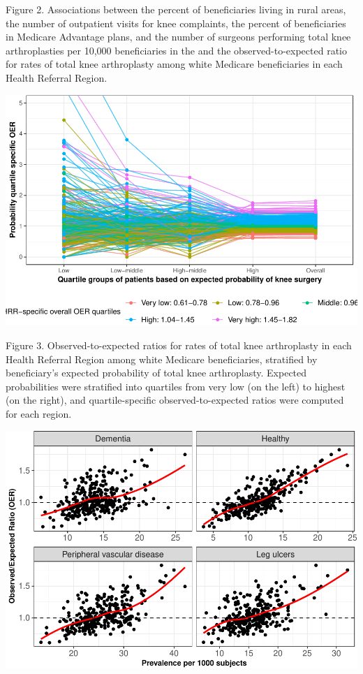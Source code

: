 \documentclass[]{article}
\begin{document}
Figure 2. Associations between the percent of beneficiaries living in
rural areas, the number of outpatient visits for knee complaints, the
percent of beneficiaries in Medicare Advantage plans, and the number of
surgeons performing total knee arthroplasties per 10,000 beneficiaries
in the and the observed-to-expected ratio for rates of total knee
arthroplasty among white Medicare beneficiaries in each Health Referral
Region.

\includegraphics{Results_files/figure-latex/Results-6-1.pdf}

Figure 3. Observed-to-expected ratios for rates of total knee
arthroplasty in each Health Referral Region among white Medicare
beneficiaries, stratified by beneficiary's expected probability of total
knee arthroplasty. Expected probabilities were stratified into quartiles
from very low (on the left) to highest (on the right), and
quartile-specific observed-to-expected ratios were computed for each
region.

\includegraphics{Results_files/figure-latex/Results-7-1.pdf}
\end{document}
